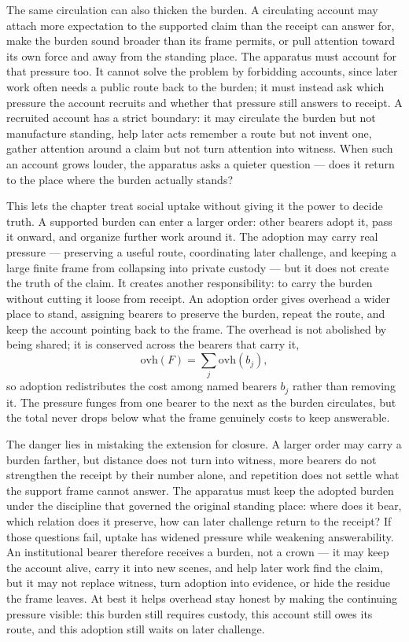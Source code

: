 The same circulation can also thicken the burden. A circulating account may attach more expectation to the supported claim than the receipt can answer for, make the burden sound broader than its frame permits, or pull attention toward its own force and away from the standing place. The apparatus must account for that pressure too. It cannot solve the problem by forbidding accounts, since later work often needs a public route back to the burden; it must instead ask which pressure the account recruits and whether that pressure still answers to receipt. A recruited account has a strict boundary: it may circulate the burden but not manufacture standing, help later acts remember a route but not invent one, gather attention around a claim but not turn attention into witness. When such an account grows louder, the apparatus asks a quieter question --- does it return to the place where the burden actually stands?

This lets the chapter treat social uptake without giving it the power to decide truth. A supported burden can enter a larger order: other bearers adopt it, pass it onward, and organize further work around it. The adoption may carry real pressure --- preserving a useful route, coordinating later challenge, and keeping a large finite frame from collapsing into private custody --- but it does not create the truth of the claim. It creates another responsibility: to carry the burden without cutting it loose from receipt. An adoption order gives overhead a wider place to stand, assigning bearers to preserve the burden, repeat the route, and keep the account pointing back to the frame. The overhead is not abolished by being shared; it is conserved across the bearers that carry it,
\[ \mathrm{ovh}(F) = \sum_{j} \mathrm{ovh}(b_j), \]
so adoption redistributes the cost among named bearers $b_j$ rather than removing it. The pressure funges from one bearer to the next as the burden circulates, but the total never drops below what the frame genuinely costs to keep answerable.

The danger lies in mistaking the extension for closure. A larger order may carry a burden farther, but distance does not turn into witness, more bearers do not strengthen the receipt by their number alone, and repetition does not settle what the support frame cannot answer. The apparatus must keep the adopted burden under the discipline that governed the original standing place: where does it bear, which relation does it preserve, how can later challenge return to the receipt? If those questions fail, uptake has widened pressure while weakening answerability. An institutional bearer therefore receives a burden, not a crown --- it may keep the account alive, carry it into new scenes, and help later work find the claim, but it may not replace witness, turn adoption into evidence, or hide the residue the frame leaves. At best it helps overhead stay honest by making the continuing pressure visible: this burden still requires custody, this account still owes its route, and this adoption still waits on later challenge.

